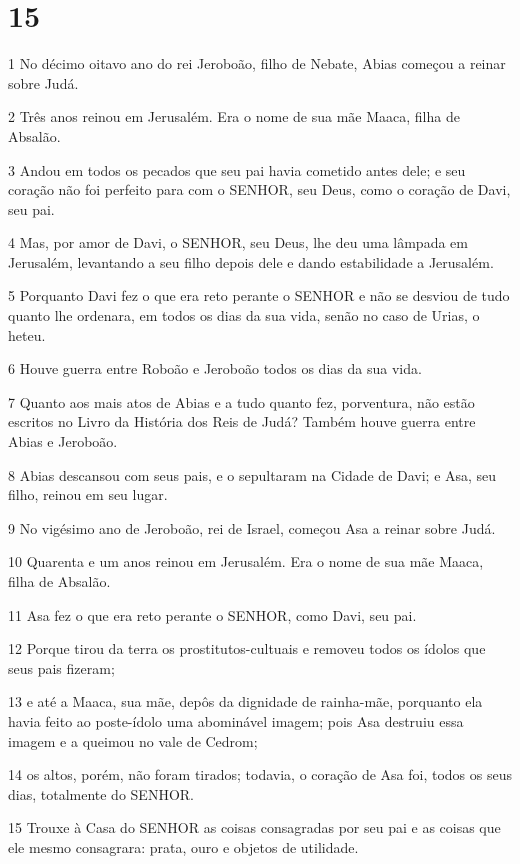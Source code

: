 \chapter{15}

\par 1 No décimo oitavo ano do rei Jeroboão, filho de Nebate, Abias começou a reinar sobre Judá.
\par 2 Três anos reinou em Jerusalém. Era o nome de sua mãe Maaca, filha de Absalão.
\par 3 Andou em todos os pecados que seu pai havia cometido antes dele; e seu coração não foi perfeito para com o SENHOR, seu Deus, como o coração de Davi, seu pai.
\par 4 Mas, por amor de Davi, o SENHOR, seu Deus, lhe deu uma lâmpada em Jerusalém, levantando a seu filho depois dele e dando estabilidade a Jerusalém.
\par 5 Porquanto Davi fez o que era reto perante o SENHOR e não se desviou de tudo quanto lhe ordenara, em todos os dias da sua vida, senão no caso de Urias, o heteu.
\par 6 Houve guerra entre Roboão e Jeroboão todos os dias da sua vida.
\par 7 Quanto aos mais atos de Abias e a tudo quanto fez, porventura, não estão escritos no Livro da História dos Reis de Judá? Também houve guerra entre Abias e Jeroboão.
\par 8 Abias descansou com seus pais, e o sepultaram na Cidade de Davi; e Asa, seu filho, reinou em seu lugar.
\par 9 No vigésimo ano de Jeroboão, rei de Israel, começou Asa a reinar sobre Judá.
\par 10 Quarenta e um anos reinou em Jerusalém. Era o nome de sua mãe Maaca, filha de Absalão.
\par 11 Asa fez o que era reto perante o SENHOR, como Davi, seu pai.
\par 12 Porque tirou da terra os prostitutos-cultuais e removeu todos os ídolos que seus pais fizeram;
\par 13 e até a Maaca, sua mãe, depôs da dignidade de rainha-mãe, porquanto ela havia feito ao poste-ídolo uma abominável imagem; pois Asa destruiu essa imagem e a queimou no vale de Cedrom;
\par 14 os altos, porém, não foram tirados; todavia, o coração de Asa foi, todos os seus dias, totalmente do SENHOR.
\par 15 Trouxe à Casa do SENHOR as coisas consagradas por seu pai e as coisas que ele mesmo consagrara: prata, ouro e objetos de utilidade.
